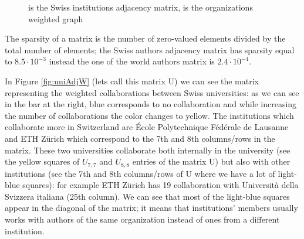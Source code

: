 \documentclass[]{usiinfbachelorproject}
\begin{document}
\begin{figure}[tb]
	\centering
	\caption{  is the Swiss institutions adjacency matrix,  is the organizations weighted graph}
	\label{fig:univAdj}
\end{figure}

The sparsity of a matrix is the number of zero-valued elements divided by the total number of elements; the Swiss authors adjacency matrix has sparsity equal to $8.5 \cdot 10^{-3}$ instead the one of the world authors matrix is $2.4 \cdot 10^{-4}$.

In Figure \ref{fig:uniAdjW} (lets call this matrix U) we can see the matrix representing the weighted collaborations between Swiss universities: as we can see in the bar at the right, blue corresponds to no collaboration and while increasing the number of collaborations the color changes to yellow.
The institutions which collaborate more in Switzerland are \'{E}cole Polytechnique F\'{e}d\'{e}rale de Lausanne and ETH Z\"{u}rich which correspond to the 7th and 8th columns/rows in the matrix. These two universities collaborate both internally in the university (see the yellow squares of $U_{7,7}$ and $U_{8,8}$ entries of the matrix U)  but also with other institutions (see the 7th and 8th columns/rows of U where we have a lot of light-blue squares): for example  ETH Z\"{u}rich has 19 collaboration with Universit\`{a} della Svizzera italiana (25th column). 
We can see that most of the light-blue squares appear in the diagonal of the matrix; it means that institutions' members usually works with authors of the same organization instead of ones from a different institution.
\end{document}
